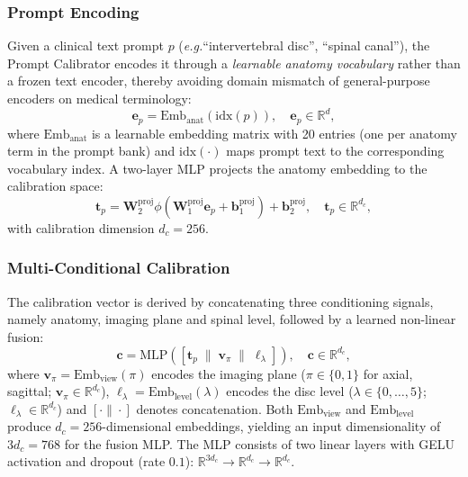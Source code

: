 \documentclass[journal]{IEEEtran}
\makeatletter
\newcommand{\eg}{\textit{e.g.}\@\xspace}
\makeatother
\begin{document}
\subsubsection{Prompt Encoding}
Given a clinical text prompt $p$ (\eg ``intervertebral disc'', ``spinal canal''), the Prompt Calibrator encodes it through a \emph{learnable anatomy vocabulary} rather than a frozen text encoder, thereby avoiding domain mismatch of general-purpose encoders on medical terminology:
\begin{equation}
    \mathbf{e}_p = \text{Emb}_{\text{anat}}(\text{idx}(p)), \quad \mathbf{e}_p \in \mathbb{R}^{d},
    \label{eq:anat_embed}
\end{equation}
where $\text{Emb}_{\text{anat}}$ is a learnable embedding matrix with 20 entries (one per anatomy term in the prompt bank) and $\text{idx}(\cdot)$ maps prompt text to the corresponding vocabulary index. A two-layer MLP projects the anatomy embedding to the calibration space:
\begin{equation}
    \mathbf{t}_p = \mathbf{W}_2^{\text{proj}}   \phi\!\left(\mathbf{W}_1^{\text{proj}}   \mathbf{e}_p + \mathbf{b}_1^{\text{proj}}\right) + \mathbf{b}_2^{\text{proj}}, \quad \mathbf{t}_p \in \mathbb{R}^{d_c},
    \label{eq:text_proj}
\end{equation}
with calibration dimension $d_c=256$.

\subsubsection{Multi-Conditional Calibration}
The calibration vector is derived by concatenating three conditioning signals, namely anatomy, imaging plane and spinal level, followed by a learned non-linear fusion:
\begin{equation}
    \mathbf{c} = \text{MLP}\!\left(\left[\mathbf{t}_p \;\|\; \mathbf{v}_\pi \;\|\; \boldsymbol\ell_\lambda\right]\right), \quad \mathbf{c} \in \mathbb{R}^{d_c},
    \label{eq:calibrator}
\end{equation}
where $\mathbf{v}_\pi = \text{Emb}_{\text{view}}(\pi)$ encodes the imaging plane ($\pi \in \{0, 1\}$ for axial, sagittal; $\mathbf{v}_\pi \in \mathbb{R}^{d_c}$), $\boldsymbol\ell_\lambda = \text{Emb}_{\text{level}}(\lambda)$ encodes the disc level ($\lambda \in \{0, \ldots, 5\}$; $\boldsymbol\ell_\lambda \in \mathbb{R}^{d_c}$) and $[\cdot \| \cdot]$ denotes concatenation. Both $\text{Emb}_{\text{view}}$ and $\text{Emb}_{\text{level}}$ produce $d_c=256$-dimensional embeddings, yielding an input dimensionality of $3d_c=768$ for the fusion MLP. The MLP consists of two linear layers with GELU activation and dropout (rate $0.1$): $\mathbb{R}^{3d_c} \to \mathbb{R}^{d_c} \to \mathbb{R}^{d_c}$.
\end{document}
